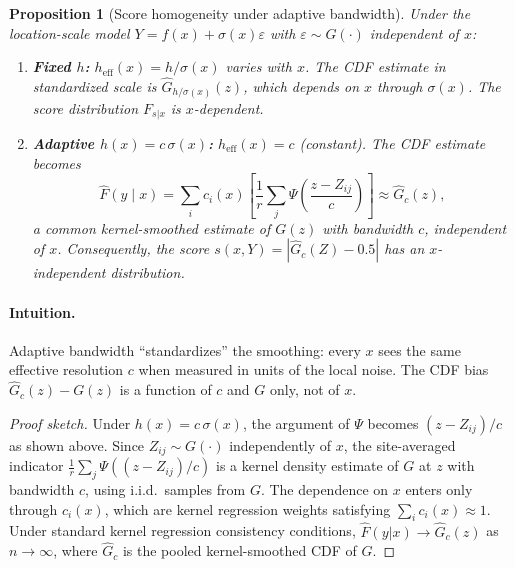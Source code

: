 \documentclass[11pt]{article}
\newtheorem{proposition}[theorem]{Proposition}
\theoremstyle{remark}
\begin{document}
\begin{proposition}[Score homogeneity under adaptive bandwidth]
\label{prop:homogeneity}
Under the location-scale model $Y = f(x) + \sigma(x)\varepsilon$
with $\varepsilon \sim G(\cdot)$ independent of $x$:
\begin{enumerate}[label=(\alph*)]
  \item \textbf{Fixed $h$:}
    $h_{\mathrm{eff}}(x) = h/\sigma(x)$ varies with $x$.
    The CDF estimate in standardized scale is
    $\hat{G}_{h/\sigma(x)}(z)$, which depends on $x$ through
    $\sigma(x)$. The score distribution $F_{s|x}$ is $x$-dependent.
  \item \textbf{Adaptive $h(x) = c\,\sigma(x)$:}
    $h_{\mathrm{eff}}(x) = c$ (constant). The CDF estimate becomes
    \begin{equation}
    \label{eq:G-hat-c}
      \hat{F}(y \mid x) = \sum_i c_i(x)\left[
        \frac{1}{r}\sum_j \Psi\!\left(\frac{z - Z_{ij}}{c}\right)
      \right] \approx \hat{G}_c(z),
    \end{equation}
    a common kernel-smoothed estimate of $G(z)$ with bandwidth $c$,
    independent of $x$. Consequently, the score
    $s(x,Y) = |\hat{G}_c(Z) - 0.5|$ has an $x$-independent distribution.
\end{enumerate}
\end{proposition}

\paragraph{Intuition.}
Adaptive bandwidth ``standardizes'' the smoothing: every $x$ sees the
same effective resolution $c$ when measured in units of the local noise.
The CDF bias $\hat{G}_c(z) - G(z)$ is a function of $c$ and $G$ only,
not of $x$.

\begin{proof}[Proof sketch]
Under $h(x) = c\,\sigma(x)$, the argument of $\Psi$ becomes
$(z - Z_{ij})/c$ as shown above. Since $Z_{ij} \sim G(\cdot)$
independently of $x$, the site-averaged indicator
$\frac{1}{r}\sum_j \Psi((z - Z_{ij})/c)$ is a kernel density estimate
of $G$ at $z$ with bandwidth $c$, using i.i.d.\ samples from $G$.
The dependence on $x$ enters only through $c_i(x)$, which are kernel
regression weights satisfying $\sum_i c_i(x) \approx 1$. Under
standard kernel regression consistency conditions,
$\hat{F}(y|x) \to \hat{G}_c(z)$ as $n \to \infty$, where
$\hat{G}_c$ is the pooled kernel-smoothed CDF of $G$.
\end{proof}
\end{document}
